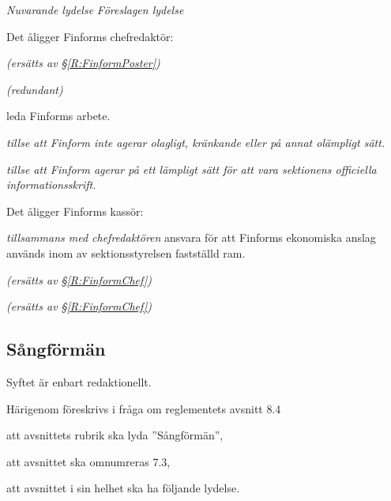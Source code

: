 \documentclass{article}
\newenvironment{lydelse}
    {\begin{paracol}{2}%
        \emph{Nuvarande lydelse}%
        \switchcolumn%
        \emph{Föreslagen lydelse}%
    \end{paracol}%
    \begin{enumerate}[label=\thesubsection.\arabic*]%
    \begin{paracol}{2}%
    }{\end{paracol}\end{enumerate}}
\begin{document}
\begin{lydelse}
    \item Det åligger Finforms chefredaktör:
    \label{R:FinformChef}
    \begin{aligganden}
        \vspace{-0.2em}
        \item[] \emph{(ersätts av \S \ref{R:FinformPoster})}\vspace{0.2em}
        \item[] \emph{(redundant)}\vspace{0.2em}
        \item leda Finforms arbete.
        \item \emph{tillse att Finform inte agerar olagligt, kränkande eller på annat olämpligt sätt.}
        \item \emph{tillse att Finform agerar på ett lämpligt sätt för att vara sektionens officiella informationsskrift.}
    \end{aligganden}
    
    \item Det åligger Finforms kassör:
    \begin{aligganden}
        \vspace{-0.2em}
        \item \emph{tillsammans med chefredaktören} ansvara för att Finforms ekonomiska anslag används inom av sektionsstyrelsen fastställd ram.
    \end{aligganden}
    
    \begin{aligganden}
        \item[] \emph{(ersätts av \S \ref{R:FinformChef})}\vspace{2.6em}
        \item[] \emph{(ersätts av \S \ref{R:FinformChef})}
    \end{aligganden}
    
\end{lydelse}

\setcounter{section}{7}
\setcounter{subsection}{2}
\subsection{Sångförmän}
Syftet är enbart redaktionellt.

Härigenom föreskrivs i fråga om reglementets avsnitt 8.4

\begin{dels}
    \item att avsnittets rubrik ska lyda ''Sångförmän'',
    \item att avsnittet ska omnumreras 7.3,
    \item att avsnittet i sin helhet ska ha följande lydelse.
\end{dels}
\end{document}
